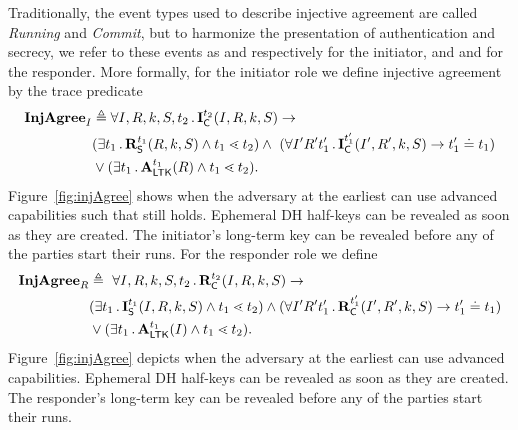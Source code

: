 {Traditionally, the event types used to describe injective agreement are called
\emph{Running} and \emph{Commit}, but to harmonize the presentation of
authentication and secrecy, we refer to these events as \mIStart{} and
\mIComplete{} respectively for the initiator, and \mRStart{} and \mRComplete{}
for the responder.
%
More formally, for the initiator role we define injective agreement by the
trace predicate
\begin{align*}
    \mathbf{InjAgree}_I& \triangleq
    \forall I, R, k, S, t_2\operatorname{.} \mathbf{I}_{\textsf{C}}^{t_2}(I, R, k, S)
    \rightarrow\\
    &(\exists t_1\operatorname{.} \mathbf{R}_{\textsf{S}}^{t_1}(R, k, S) \land t_1 \lessdot t_2)
    \land\ (\forall I' R' t_1' \operatorname{.} \mathbf{I}_{\textsf{C}}^{t_1'}(I' , R', k, S)
        \rightarrow t_1' \doteq t_1) \\
    &\lor(\exists t_1\operatorname{.} \mathbf{A}_{\textsf{LTK}}^{t_1}(R) \land t_1 \lessdot t_2).
\end{align*}
%
Figure~\ref{fig:injAgree} shows when the adversary at the earliest can use
advanced capabilities such that \mPredInjI{} still holds.
%
Ephemeral DH half-keys can be revealed as soon as they are created.
%
The initiator's long-term key can be revealed before any of the parties start
their runs.
%
For the responder role we define
\begin{align*}
    \mathbf{InjAgree}_R& \triangleq\
    \forall I, R, k, S, t_2\operatorname{.} \mathbf{R}_{\textsf{C}}^{t_2}(I, R, k, S)
    \rightarrow\\
    &(\exists t_1\operatorname{.} \mathbf{I}_{\textsf{S}}^{t_1}(I, R, k, S) \land t_1 \lessdot t_2)
    \land (\forall I' R' t_1' \operatorname{.} \mathbf{R}_{\textsf{C}}^{t_1'}(I' , R', k, S)
        \rightarrow t_1' \doteq t_1)\\
    &\lor(\exists t_1\operatorname{.} \mathbf{A}_{\textsf{LTK}}^{t_1}(I) \land t_1 \lessdot t_2).
\end{align*}
%
Figure~\ref{fig:injAgree} depicts when the adversary at the earliest can use
advanced capabilities.
%
Ephemeral DH half-keys can be revealed as soon as they are created.
%
The responder's long-term key can be revealed before any of the parties start
their runs.
%
\begin{figure}[h!]
    \begin{center}
        \tikzset{>=latex}
\end{center}
\end{figure}}

